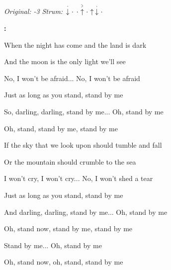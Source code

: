 \begin{song}


\begin{headerbox}
\RaiseBoxWithAccents
\textit{Original: -3} \quad
\textit{Strum:} $\StaccatoDown\Miss\Miss\AccentUp\Miss\Up\StaccatoDown\Miss$
\end{headerbox}

\begin{hchordbox}
\end{hchordbox}

\Large

\bigskip

\Intro\textbf{:}      \par

\bigskip

When the night has come  and the land is dark \par
And the moon is the only light we'll see \par
No, I won't be afraid... No, I won't be afraid \par
Just as long as you stand, stand by me \par

\bigskip

So, darling, darling, stand by me... Oh, stand by me \par
Oh, stand,  stand by me,  stand by me \par


\bigskip

If the sky that we look upon  should tumble and fall \par
Or the mountain should crumble to the sea \par
I won't cry, I won't cry... No, I won't shed a tear \par
Just as long as you stand, stand by me \par

\bigskip

And darling, darling, stand by me... Oh, stand by me \par
Oh, stand now,  stand by me,  stand by me \par

\bigskip

 \par
{}Stand by me... Oh, stand by me \par
Oh, stand now, oh, stand, stand by me \par

\end{song}